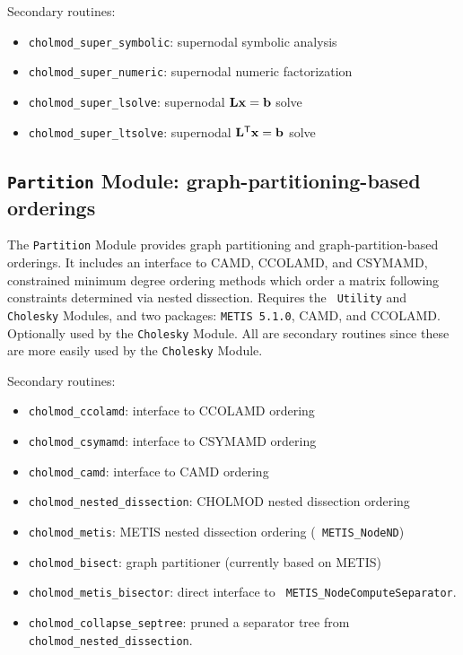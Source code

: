\documentclass[11pt]{article}
\newcommand{\m}[1]{{\bf{#1}}}       %
\newcommand{\tr}{^{\sf T}}          %
\begin{document}
\vspace{0.1in}
\noindent Secondary routines:

    \begin{itemize}
    \item {\tt cholmod\_super\_symbolic}: supernodal symbolic analysis
    \item {\tt cholmod\_super\_numeric}: supernodal numeric factorization
    \item {\tt cholmod\_super\_lsolve}: supernodal $\m{Lx}=\m{b}$ solve
    \item {\tt cholmod\_super\_ltsolve}: supernodal $\m{L}\tr\m{x}=\m{b}$ solve
    \end{itemize}

\subsection{{\tt Partition} Module: graph-partitioning-based orderings}

The {\tt Partition} Module provides graph partitioning and
graph-partition-based orderings.  It includes an interface to CAMD, CCOLAMD,
and CSYMAMD, constrained minimum degree ordering methods which order a matrix
following constraints determined via nested dissection.  Requires the {\tt
Utility} and {\tt Cholesky} Modules, and two packages: {\tt METIS 5.1.0}, CAMD,
and CCOLAMD.  Optionally used by the {\tt Cholesky} Module.  All are secondary
routines since these are more easily used by the {\tt Cholesky} Module.

\vspace{0.1in}
\noindent Secondary routines:

    \begin{itemize}
    \item {\tt cholmod\_ccolamd}: interface to CCOLAMD ordering
    \item {\tt cholmod\_csymamd}: interface to CSYMAMD ordering
    \item {\tt cholmod\_camd}: interface to CAMD ordering
    \item {\tt cholmod\_nested\_dissection}: CHOLMOD nested dissection ordering
    \item {\tt cholmod\_metis}: METIS nested dissection ordering ({\tt
    METIS\_NodeND})
    \item {\tt cholmod\_bisect}: graph partitioner (currently based on METIS)
    \item {\tt cholmod\_metis\_bisector}: direct interface to {\tt
    METIS\_NodeComputeSeparator}.
    \item {\tt cholmod\_collapse\_septree}: pruned a separator tree from
    {\tt cholmod\_nested\_dissection}.
    \end{itemize}
\end{document}
